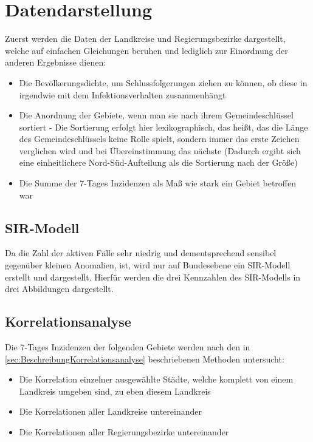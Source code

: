 \section{Datendarstellung}
Zuerst werden die Daten der Landkreise und Regierungsbezirke dargestellt, welche auf einfachen Gleichungen beruhen und lediglich zur Einordnung der anderen Ergebnisse dienen:
\begin{itemize}
    \item Die Bevölkerungsdichte, um Schlussfolgerungen ziehen zu können, ob diese in irgendwie mit dem Infektionsverhalten zusammenhängt
    \item Die Anordnung der Gebiete, wenn man sie nach ihrem Gemeindeschlüssel sortiert - Die Sortierung erfolgt hier lexikographisch, das heißt, das die Länge des Gemeindeschlüssels keine Rolle spielt, sondern immer das erste Zeichen verglichen wird und bei Übereinstimmung das nächste (Dadurch ergibt sich eine einheitlichere Nord-Süd-Aufteilung als die Sortierung nach der Größe)
    \item Die Summe der 7-Tages Inzidenzen als Maß wie stark ein Gebiet betroffen war
\end{itemize}
\subsection{SIR-Modell}
Da die Zahl der aktiven Fälle sehr niedrig und dementsprechend sensibel gegenüber kleinen Anomalien, ist, wird nur auf Bundesebene ein SIR-Modell erstellt und dargestellt. 
Hierfür werden die drei Kennzahlen des SIR-Modells in drei Abbildungen dargestellt.

\subsection{Korrelationsanalyse}
Die 7-Tages Inzidenzen der folgenden Gebiete werden nach den in \autoref{sec:BeschreibungKorrelationsanalyse} beschriebenen Methoden untersucht:
\begin{itemize}
    \item Die Korrelation einzelner ausgewählte Städte, welche komplett von einem Landkreis umgeben sind, zu eben diesem Landkreis
    \item Die Korrelationen aller Landkreise untereinander
    \item Die Korrelationen aller Regierungsbezirke untereinander
\end{itemize}



